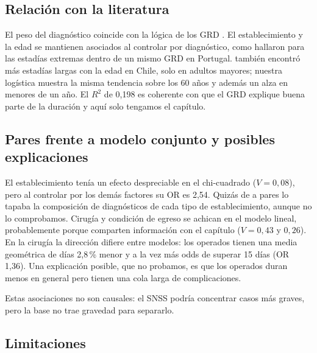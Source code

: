 \documentclass[10.5pt,a4paper,headings=small,abstract=false,bibliography=totoc,listof=totoc]{scrartcl}
\newcommand{\pct}{\,\%}
\begin{document}
\subsection{Relación con la literatura}

El peso del diagnóstico coincide con la lógica de los GRD \citep{fetter1980}. El establecimiento y la edad se mantienen asociados al controlar por diagnóstico, como hallaron \citet{freitas2012} para las estadías extremas dentro de un mismo GRD en Portugal. \citet{olivares2020} también encontró más estadías largas con la edad en Chile, solo en adultos mayores; nuestra logística muestra la misma tendencia sobre los 60 años y además un alza en menores de un año. El $R^2$ de 0,198 es coherente con que el GRD explique buena parte de la duración y aquí solo tengamos el capítulo.

\subsection{Pares frente a modelo conjunto y posibles explicaciones}

El establecimiento tenía un efecto despreciable en el chi-cuadrado ($V=0{,}08$), pero al controlar por los demás factores su OR es 2,54. Quizás de a pares lo tapaba la composición de diagnósticos de cada tipo de establecimiento, aunque no lo comprobamos. Cirugía y condición de egreso se achican en el modelo lineal, probablemente porque comparten información con el capítulo ($V=0{,}43$ y $0{,}26$). En la cirugía la dirección difiere entre modelos: los operados tienen una media geométrica de días 2,8\pct{} menor y a la vez más odds de superar 15 días (OR 1,36). Una explicación posible, que no probamos, es que los operados duran menos en general pero tienen una cola larga de complicaciones.

Estas asociaciones no son causales: el SNSS podría concentrar casos más graves, pero la base no trae gravedad para separarlo.

\subsection{Limitaciones}
\end{document}
